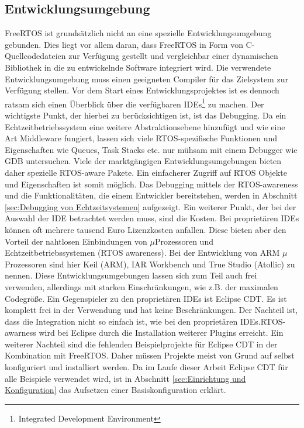 \subsection{Entwicklungsumgebung}
\label{ref:Entwicklungsumgebung}
FreeRTOS ist grundsätzlich nicht an eine spezielle Entwicklungsumgebung gebunden. Dies liegt vor allem daran, dass FreeRTOS in Form von C-Quellcodedateien zur Verfügung gestellt und vergleichbar einer dynamischen Bibliothek in die zu entwickelnde Software integriert wird. Die verwendete Entwicklungsumgebung muss einen geeigneten Compiler für das Zielsystem zur Verfügung stellen. Vor dem Start eines Entwicklungsprojektes ist es dennoch ratsam sich einen Überblick über die ver\-fügbaren IDEs\footnote{Integrated Development Environment} zu machen. Der wichtigste Punkt, der hierbei zu berücksichtigen ist, ist das Debugging. Da ein Echtzeitbetriebssystem eine weitere Abstraktionsebene hinzufügt und wie eine Art Middleware fungiert, lassen sich viele RTOS-spezifische Funktionen und Eigenschaften wie Queues, Task Stacks etc. nur mühsam mit einem Debugger wie GDB untersuchen. Viele der markt\-gäng\-igen Entwicklungsumgebungen bieten daher spezielle RTOS-aware Pakete. Ein einfacherer Zugriff auf RTOS Objekte und Eigenschaften ist somit möglich. Das Debugging mittels der RTOS-awareness und die Funktionalitäten, die einem Entwickler bereitstehen, werden in Abschnitt \ref{sec:Debugging von Echtzeitsystemen} aufgezeigt. Ein weiterer Punkt, der bei der Auswahl der IDE betrachtet werden muss, sind die Kosten. Bei proprietären IDEs können oft mehrere tausend Euro Lizenzkosten anfallen. Diese bieten aber den Vorteil der nahtlosen Einbindungen von $\mu$Prozessoren und Echtzeitbetriebssystemen (RTOS\- aware\-ness). Bei der Entwicklung von ARM $\mu$\-Prozessoren sind hier Keil (ARM), IAR Workbench und True Studio (Atollic) zu nennen. Diese Entwicklungsumgebungen lassen sich zum Teil auch frei verwenden, allerdings mit starken Einschränkungen, wie z.B. der maximalen Codegröße. Ein Gegenspieler zu den proprietären IDEs ist Eclipse CDT. Es ist komplett frei in der Verwendung und hat keine Beschränkungen. Der Nachteil ist, dass die Integration nicht so einfach ist, wie bei den proprietären IDEs.\newline RTOS-awarness wird bei Eclipse durch die Installation weiterer Plugins erreicht. Ein weiterer Nachteil sind die fehlenden Beispielprojekte für Eclipse CDT in der Kombination mit FreeRTOS. Daher müssen Projekte meist von Grund auf selbst konfiguriert und installiert werden. Da im Laufe dieser Arbeit Eclipse CDT für alle Beispiele verwendet wird, ist in Abschnitt \ref{sec:Einrichtung und Konfiguration} das Aufsetzen einer Basiskonfiguration erklärt.